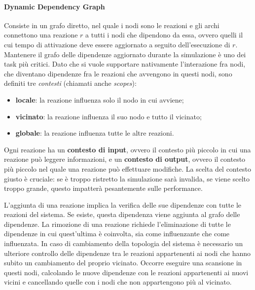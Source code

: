 \documentclass[12pt,a4paper,openright,twoside]{book}
\begin{document}
\paragraph{Dynamic Dependency Graph}
Consiste in un grafo diretto, nel quale i nodi sono le reazioni e gli archi connettono una reazione $r$ a tutti i nodi che dipendono da essa, ovvero quelli il cui tempo di attivazione deve essere aggiornato a seguito dell'esecuzione di $r$. 
Mantenere il grafo delle dipendenze aggiornato durante la simulazione è uno dei task più critici. Dato che si vuole supportare nativamente l'interazione fra nodi, che diventano dipendenze fra le reazioni che avvengono in questi nodi, sono definiti tre \textit{contesti} (chiamati anche \textit{scopes}): 
\begin{itemize}
    \item \textbf{locale}: la reazione influenza solo il nodo in cui avviene; 
    \item \textbf{vicinato}: la reazione influenza il suo nodo e tutto il vicinato; 
    \item \textbf{globale}: la reazione influenza tutte le altre reazioni. 
\end{itemize}

Ogni reazione ha un \textbf{contesto di input}, ovvero il contesto più piccolo in cui una reazione può leggere informazioni, e un \textbf{contesto di output}, ovvero il contesto più piccolo nel quale una reazione può effettuare modifiche. 
La scelta del contesto giusto è cruciale: se è troppo ristretto la simulazione sarà invalida, se viene scelto troppo grande, questo impatterà pesantemente sulle performance. 

L'aggiunta di una reazione implica la verifica delle sue dipendenze con tutte le reazioni del sistema. Se esiste, questa dipendenza viene aggiunta al grafo delle dipendenze. La rimozione di una reazione richiede l'eliminazione di tutte le dipendenze in cui quest'ultima è coinvolta, sia come influenzante che come influenzata. 
In caso di cambiamento della topologia del sistema è necessario un ulteriore controllo delle dipendenze tra le reazioni appartenenti ai nodi che hanno subito un cambiamento del proprio vicinato. Occorre eseguire una scansione in questi nodi, calcolando le nuove dipendenze con le reazioni appartenenti ai nuovi vicini e cancellando quelle con i nodi che non appartengono più al vicinato.

\end{document}
